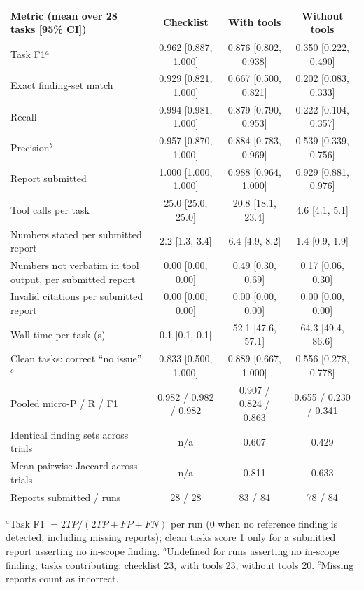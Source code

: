 \begin{tabular}{@{}lccc@{}}
\toprule
Metric (mean over 28 tasks [95\% CI]) & Checklist & With tools & Without tools \\
\midrule
Task F1$^{a}$ & 0.962 [0.887, 1.000] & 0.876 [0.802, 0.938] & 0.350 [0.222, 0.490] \\
Exact finding-set match & 0.929 [0.821, 1.000] & 0.667 [0.500, 0.821] & 0.202 [0.083, 0.333] \\
Recall & 0.994 [0.981, 1.000] & 0.879 [0.790, 0.953] & 0.222 [0.104, 0.357] \\
Precision$^{b}$ & 0.957 [0.870, 1.000] & 0.884 [0.783, 0.969] & 0.539 [0.339, 0.756] \\
Report submitted & 1.000 [1.000, 1.000] & 0.988 [0.964, 1.000] & 0.929 [0.881, 0.976] \\
Tool calls per task & 25.0 [25.0, 25.0] & 20.8 [18.1, 23.4] & 4.6 [4.1, 5.1] \\
Numbers stated per submitted report & 2.2 [1.3, 3.4] & 6.4 [4.9, 8.2] & 1.4 [0.9, 1.9] \\
Numbers not verbatim in tool output, per submitted report & 0.00 [0.00, 0.00] & 0.49 [0.30, 0.69] & 0.17 [0.06, 0.30] \\
Invalid citations per submitted report & 0.00 [0.00, 0.00] & 0.00 [0.00, 0.00] & 0.00 [0.00, 0.00] \\
Wall time per task (s) & 0.1 [0.1, 0.1] & 52.1 [47.6, 57.1] & 64.3 [49.4, 86.6] \\
Clean tasks: correct ``no issue''$^{c}$ & 0.833 [0.500, 1.000] & 0.889 [0.667, 1.000] & 0.556 [0.278, 0.778] \\
\midrule
Pooled micro-P / R / F1 & 0.982 / 0.982 / 0.982 & 0.907 / 0.824 / 0.863 & 0.655 / 0.230 / 0.341 \\
Identical finding sets across trials & n/a & 0.607 & 0.429 \\
Mean pairwise Jaccard across trials & n/a & 0.811 & 0.633 \\
Reports submitted / runs & 28 / 28 & 83 / 84 & 78 / 84 \\
\bottomrule
\end{tabular}
\par\smallskip\footnotesize $^{a}$Task F1 $=2TP/(2TP+FP+FN)$ per run (0 when no reference finding is detected, including missing reports); clean tasks score 1 only for a submitted report asserting no in-scope finding. $^{b}$Undefined for runs asserting no in-scope finding; tasks contributing: checklist 23, with tools 23, without tools 20. $^{c}$Missing reports count as incorrect.
